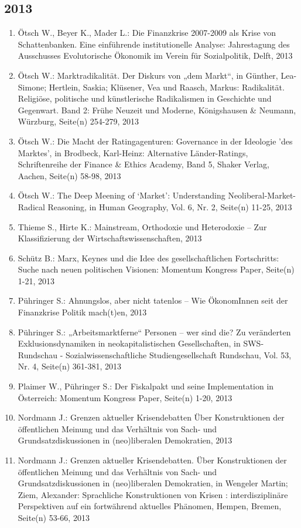 \subsection*{2013}
\begin{enumerate}
    	 \item Ötsch W., Beyer K., Mader L.: Die Finanzkrise 2007-2009 als Krise von Schattenbanken. Eine einführende institutionelle Analyse: Jahrestagung des Ausschusses Evolutorische Ökonomik im Verein für Sozialpolitik, Delft, 2013
	 \item Ötsch W.: Marktradikalität. Der Diskurs von „dem Markt“, in Günther, Lea-Simone; Hertlein, Saskia;  Klüsener, Vea und Raasch, Markus: Radikalität. Religiöse, politische und künstlerische Radikalismen in Geschichte und Gegenwart.  Band 2: Frühe Neuzeit und Moderne, Königshausen \& Neumann, Würzburg, Seite(n) 254-279, 2013
	 \item Ötsch W.: Die Macht der Ratingagenturen: Governance in der Ideologie 'des Marktes', in Brodbeck, Karl-Heinz: Alternative Länder-Ratings, Schriftenreihe der Finance \& Ethics Academy, Band 5, Shaker Verlag, Aachen, Seite(n) 58-98, 2013
	 \item Ötsch W.: The Deep Meening of ‘Market’: Understanding Neoliberal-Market-Radical Reasoning, in Human Geography, Vol. 6, Nr. 2, Seite(n) 11-25, 2013
	 \item Thieme S., Hirte K.: Mainstream, Orthodoxie und Heterodoxie – Zur Klassifizierung der Wirtschaftswissenschaften, 2013
	 \item Schütz B.: Marx, Keynes und die Idee des gesellschaftlichen Fortschritts: Suche nach neuen politischen Visionen: Momentum Kongress Paper, Seite(n) 1-21, 2013
	 \item Pühringer S.: Ahnungslos, aber nicht tatenlos – Wie ÖkonomInnen seit der Finanzkrise Politik mach(t)en, 2013
	 \item Pühringer S.: „Arbeitsmarktferne“ Personen – wer sind die? Zu veränderten Exklusionsdynamiken in neokapitalistischen Gesellschaften, in SWS-Rundschau - Sozialwissenschaftliche Studiengesellschaft Rundschau, Vol. 53, Nr. 4, Seite(n) 361-381, 2013
	 \item Plaimer W., Pühringer S.: Der Fiskalpakt und seine Implementation in Österreich: Momentum Kongress Paper, Seite(n) 1-20, 2013
	 \item Nordmann J.: Grenzen aktueller Krisendebatten Über Konstruktionen der öffentlichen Meinung und das Verhältnis von Sach‐ und Grundsatzdiskussionen in (neo)liberalen Demokratien, 2013
	 \item Nordmann J.: Grenzen aktueller Krisendebatten. Über Konstruktionen der öffentlichen Meinung und das Verhältnis von Sach- und Grundsatzdiskussionen in (neo)liberalen Demokratien, in Wengeler Martin; Ziem, Alexander: Sprachliche Konstruktionen von Krisen : interdisziplinäre Perspektiven auf ein fortwährend aktuelles Phänomen, Hempen, Bremen, Seite(n) 53-66, 2013

\end{enumerate}
